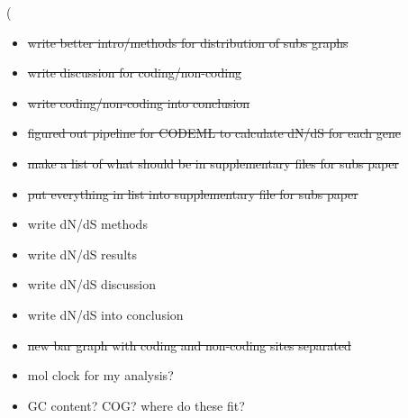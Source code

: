\left( \documentclass[12pt]{article}
\begin{document}
\begin{itemize}
	\item \sout{write better intro/methods for distribution of subs graphs}
	
	\item \sout{write discussion for coding/non-coding}
	
	\item \sout{write coding/non-coding into conclusion}
	
	\item \sout{figured out pipeline for CODEML to calculate dN/dS for each gene}
	
	\item \sout{make a list of what should be in supplementary files for subs paper}
	
	\item \sout{put everything in list into supplementary file for subs paper}
	
	\item write dN/dS methods
	
	\item write dN/dS results
	
	\item write dN/dS discussion
	
	\item write dN/dS into conclusion
	
	\item \sout{new bar graph with coding and non-coding sites separated}
	
	\item mol clock for my analysis?
	
	\item GC content? COG? where do these fit?
	
\end{itemize}
\end{document}

